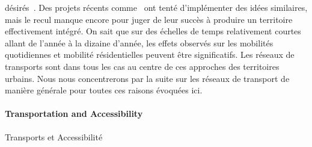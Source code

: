 {désirés~\cite{es119}. Des projets récents comme~\cite{l2012ville} ont tenté d'implémenter des idées similaires, mais le recul manque encore pour juger de leur succès à produire un territoire effectivement intégré. On sait que sur des échelles de temps relativement courtes allant de l'année à la dizaine d'année, les effets observés sur les mobilités quotidiennes et mobilité résidentielles peuvent être significatifs. Les réseaux de transports sont dans tous les cas au centre de ces approches des territoires urbains. Nous nous concentrerons par la suite sur les réseaux de transport de manière générale pour toutes ces raisons évoquées ici.
}



\paragraph{Transportation and Accessibility}{Transports et Accessibilité}



